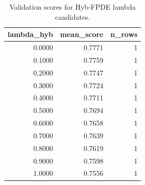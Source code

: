 \begin{table}[t]
\caption{Validation scores for Hyb-FPDE lambda candidates.}
\label{tab:lambda_distribution_computed}
\centering
\begin{tabular}{rrr}
\toprule
lambda\_hyb & mean\_score & n\_rows \\
\midrule
0.0000 & 0.7771 & 1 \\
0.1000 & 0.7759 & 1 \\
0.2000 & 0.7747 & 1 \\
0.3000 & 0.7724 & 1 \\
0.4000 & 0.7711 & 1 \\
0.5000 & 0.7694 & 1 \\
0.6000 & 0.7658 & 1 \\
0.7000 & 0.7639 & 1 \\
0.8000 & 0.7619 & 1 \\
0.9000 & 0.7598 & 1 \\
1.0000 & 0.7556 & 1 \\
\bottomrule
\end{tabular}

\end{table}
